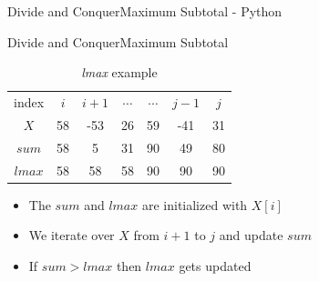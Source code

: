 {%

\begin{frame}{Divide and Conquer}{Maximum Subtotal - Python}
  \vspace{-0.5em}
  
\end{frame}
}



\begin{frame}{Divide and Conquer}{Maximum Subtotal}
  \begin{table}
    \caption{\textit{lmax} example}
    \label{fig:divide_and_conquer:lmax_example}
    \begin{tabular}{c|cccccc}
      index & $i$ & $i+1$ & $\cdots$ & $\cdots$ & $j-1$ & $j$\\
      $X$ & 58 & -53 & 26 & 59 & -41 & 31\\
       {\color{MainA}$sum$} & 58 & 5 & 31 & 90 & 49 & 80\\
      {\color{MainA}$lmax$} & 58 & 58 & 58 & 90 & 90 & 90\\
    \end{tabular}
  \end{table}
  \begin{itemize}
    \item<2->
      The {\color{MainA}$sum$} and {\color{MainA}$lmax$} are initialized with $X[i]$
    \item<3->
      We iterate over {\color{MainA}$X$} from {\color{MainA}$i+1$} to {\color{MainA}$j$} and update {\color{MainA}$sum$}
    \item<4->
      If {\color{MainA}$sum > lmax$} then {\color{MainA}$lmax$}
      gets updated
  \end{itemize}
\end{frame}


